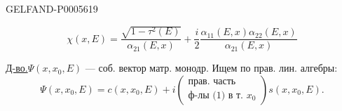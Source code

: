 \begin{GelfandAdjacentEvidence}{GELFAND-P000561}{9}

\begin{equation*}
\chi(x,E)=\frac{\sqrt{1-\tau^2(E)}}{\alpha_{21}(E,x)}
+\frac i2\frac{\alpha_{11}(E,x)\alpha_{22}(E,x)}{\alpha_{21}(E,x)}
\tag{1}
\end{equation*}
\end{GelfandAdjacentEvidence}

\underline{Д-во.}\quad \(\Psi(x,x_0,E)\) — соб. вектор матр. монодр. Ищем по прав. лин. алгебры:
\[
\Psi(x,x_0,E)=c(x,x_0,E)+
i\left(\begin{gathered}\text{прав. часть}\\\text{ф-лы (1) в т. }x_0\end{gathered}\right)s(x,x_0,E).
\]


